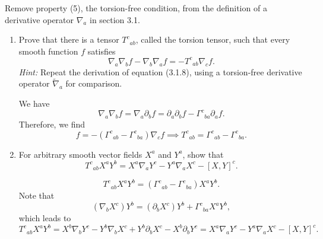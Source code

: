 Remove property (5), the torsion-free condition, from the definition of a derivative
operator $\nabla_a$ in section 3.1.
\begin{enumerate}[label=\alph*)]
    \item Prove that there is a tensor $T^c{}_{ab}$, called the torsion tensor,
    such that every smooth function $f$ satisfies
    \begin{equation}
        \nabla_a\nabla_bf-\nabla_b\nabla_af
        =-T^c{}_{ab}\nabla_cf.
    \end{equation}
    \textit{Hint:} Repeat the derivation of equation (3.1.8), using a
    torsion-free derivative operator $\widetilde\nabla_a$ for comparison.
    \begin{solution}
        We have
        \begin{equation}
            \nabla_a \nabla_b f = \nabla_a \partial_b f = \partial_a \partial_b f - \Gamma^c{}_{ba}\partial_a f.
        \end{equation}
        Therefore, we find
        \begin{equation}
            [\nabla_a,\nabla_b]f = -(\Gamma^c{}_{ab} -\Gamma^c{}_{ba})\nabla_c f \implies T^c{}_{ab} = \Gamma^c{}_{ab} -\Gamma^c{}_{ba}.
        \end{equation}
    \end{solution}

    \item For arbitrary smooth vector fields $X^a$ and $Y^a$, show that
    \begin{equation}
        T^c{}_{ab}X^aY^b
        =X^a\nabla_aY^c-Y^a\nabla_aX^c-[X,Y]^c.
    \end{equation}
    \begin{solution}
        \begin{equation}
            T^c{}_{ab}X^aY^b = (\Gamma^c{}_{ab} -\Gamma^c{}_{ba})X^aY^b.
        \end{equation}
        Note that
        \begin{equation}
            (\nabla_b X^c)Y^b = (\partial_bX^c)Y^b + \Gamma^c{}_{ba}X^aY^b,
        \end{equation}
        which leads to
        \begin{equation}
            T^c{}_{ab}X^aY^b = X^b\nabla_b Y^c - Y^b\nabla_b X^c + Y^b\partial_b X^c - X^b\partial_b Y^c = X^a\nabla_aY^c-Y^a\nabla_aX^c-[X,Y]^c.
        \end{equation}
    \end{solution}


\end{enumerate}
